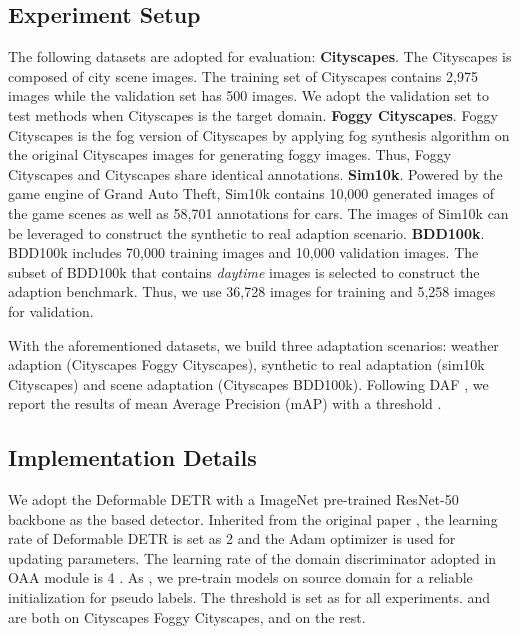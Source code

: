 \documentclass[sigconf]{acmart}
\begin{document}
\subsection{Experiment Setup}
The following datasets are adopted for evaluation:
\textbf{Cityscapes}. The Cityscapes \cite{cityscapes} is composed of city scene images. The training set of Cityscapes contains 2,975 images while the validation set has 500 images. We adopt the validation set to test methods when Cityscapes is the target domain.
\textbf{Foggy Cityscapes}. Foggy Cityscapes \cite{foggy} is the fog version of Cityscapes by applying fog synthesis algorithm on the original Cityscapes images for generating foggy images. Thus, Foggy Cityscapes and Cityscapes share identical annotations. 
\textbf{Sim10k}. Powered by the game engine of Grand Auto Theft, Sim10k \cite{sim10k} contains 10,000 generated images of the game scenes as well as 58,701 annotations for cars. The images of Sim10k can be leveraged to construct the synthetic to real adaption scenario.
\textbf{BDD100k}. BDD100k \cite{yu2018bdd100k} includes 70,000 training images and 10,000 validation images. The subset of BDD100k that contains \textit{daytime} images is selected to construct the adaption benchmark. Thus, we use 36,728 images for training and 5,258 images for validation.

With the aforementioned datasets, we build three adaptation scenarios: weather adaption (Cityscapes  Foggy Cityscapes), synthetic to real adaptation (sim10k  Cityscapes) and scene adaptation (Cityscapes  BDD100k). Following DAF \cite{faster-rcnn}, we report the results of mean Average Precision (mAP) with a threshold .


\subsection{Implementation Details}
We adopt the Deformable DETR \cite{zhu2020deformable} with a ImageNet \cite{deng2009imagenet} pre-trained ResNet-50 \cite{resnet} backbone as the based detector. Inherited from the original paper \cite{zhu2020deformable}, the learning rate of Deformable DETR is set as 2   and the Adam optimizer \cite{kingma2014adam} is used for updating parameters. The learning rate of the domain discriminator adopted in OAA module is 4  . As \cite[]{jiang2021decoupled}, we pre-train models on source domain for a reliable initialization for pseudo labels. The threshold  is set as  for all experiments.  and  are both  on Cityscapes  Foggy Cityscapes, and  on the rest. 
\end{document}
